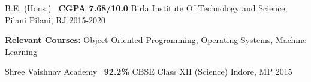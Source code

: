 \begin{cventries}
  \cventry
    {B.E. (Hons.) \textbar\ \textbf{CGPA 7.68/10.0}}
    {Birla Institute Of Technology and Science, Pilani}
    {Pilani, RJ}
    {2015-2020}
    {
      \begin{cvitems}
        \item {\textbf{Relevant Courses:} Object Oriented Programming, Operating Systems, Machine Learning}
      \end{cvitems}
    }
  \cventry
    {Shree Vaishnav Academy \textbar\ \textbf{92.2\%}}
    {CBSE Class XII (Science)}
    {Indore, MP}
    {2015}
    {}
\end{cventries}
